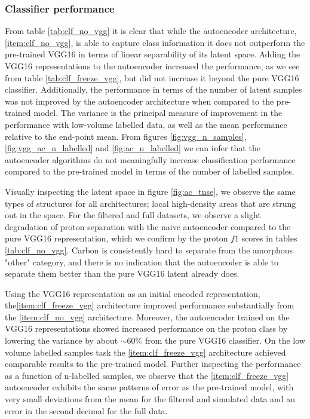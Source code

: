 {\subsubsection{Classifier performance}

From table \ref{tab:clf_no_vgg} it is clear that while the autoencoder architecture, \ref{item:clf_no_vgg}, is able to capture class information it does not outperform the pre-trained VGG16 in terms of linear separability of its latent space. Adding the VGG16 representations to the autoencoder increased the performance, as we see from table \ref{tab:clf_freeze_vgg}, but did not increase it beyond the pure VGG16 classifier.  Additionally, the performance in terms of the number of latent samples was not improved by the autoencoder architecture when compared to the pre-trained model. The variance is the principal measure of improvement in the performance with low-volume labelled data, as well as the mean performance relative to the end-point mean. From figures \ref{fig:vgg_n_samples}, \ref{fig:vgg_ac_n_labelled}  and \ref{fig:ac_n_labelled} we can infer that the autoencoder algorithms do not meaningfully increase classification performance  compared to the pre-trained model in terms of the number of labelled samples.

Visually inspecting the latent space in figure \ref{fig:ac_tnse}, we observe the same types of structures for all architectures; local high-density areas that are strung out in the space. For the filtered and full datasets, we observe a slight degradation of proton separation with the naive autoencoder compared to the pure VGG16 representation, which we confirm by the proton $f1$ scores in tables \ref{tab:clf_no_vgg}. Carbon is consistently hard to separate from the amorphous "other" category, and there is no indication that the autoencoder is able to separate them better than the pure VGG16 latent already does. 

Using the VGG16 representation as an initial encoded representation, the\ref{item:clf_freeze_vgg} architecture improved performance substantially from the \ref{item:clf_no_vgg} architecture. Moreover, the autoencoder trained on the VGG16 representations showed increased performance on the proton class by lowering the variance by about $\sim 60\%$  from the pure VGG16 classifier. On the low volume labelled samples task the \ref{item:clf_freeze_vgg} architecture achieved comparable results to the pre-trained model. Further inspecting the performance as a function of n-labelled samples, we observe that the \ref{item:clf_freeze_vgg} autoencoder exhibits the same patterns of error as the pre-trained model, with very small deviations from the mean for the filtered and simulated data and an error in the second decimal for the full data.

}
